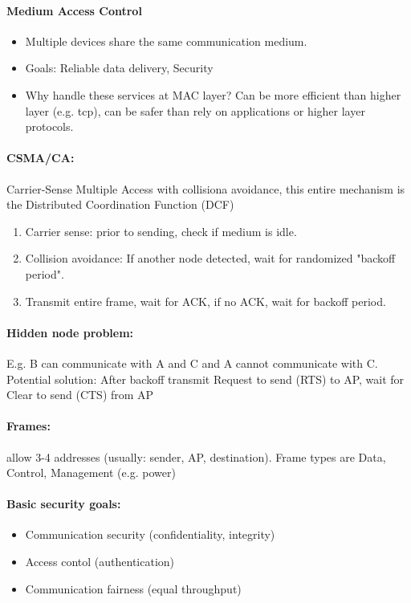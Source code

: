 \paragraph{Medium Access Control}
\begin{itemize}
    \item Multiple devices share the same communication medium.
    \item Goals: Reliable data delivery, Security
    \item Why handle these services at MAC layer? Can be more efficient than higher layer (e.g. tcp), can be safer than rely on applications or higher layer protocols.
\end{itemize}

\paragraph{CSMA/CA:} Carrier-Sense Multiple Access with collisiona avoidance, this entire mechanism is the Distributed Coordination Function (DCF)
\begin{enumerate}
    \item Carrier sense: prior to sending, check if medium is idle.
    \item Collision avoidance: If another node detected, wait for randomized "backoff period".
    \item Transmit entire frame, wait for ACK, if no ACK, wait for backoff period.
\end{enumerate}

\paragraph{Hidden node problem:} E.g. B can communicate with A and C and A cannot communicate with C.
Potential solution: After backoff transmit Request to send (RTS) to AP, wait for Clear to send (CTS) from AP

\paragraph{Frames:} allow 3-4 addresses (usually: sender, AP, destination). Frame types are Data, Control, Management (e.g. power)

\paragraph{Basic security goals:}
\begin{itemize}
    \item Communication security (confidentiality, integrity)
    \item Access contol (authentication)
    \item Communication fairness (equal throughput)
\end{itemize}

